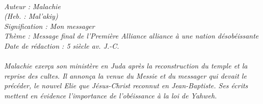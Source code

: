 \BFont
\noindent\hrulefill
{\footnotesize
\textit{
\bigskip
{\centering{}
\\Auteur : Malachie
\\(Heb. : Mal'akiy)
\\Signification : Mon messager
\\Thème : Message final de l'Première Alliance alliance à une nation désobéissante
\\Date de rédaction : 5 siècle av. J.-C.\\}
}
\textit{
\\Malachie exerça son ministère en Juda après la reconstruction du temple et la reprise des cultes. Il annonça la venue du Messie et du messager qui devait le précéder, le nouvel Elie que Jésus-Christ reconnut en Jean-Baptiste. Ses écrits mettent en évidence l'importance de l'obéissance à la loi de Yahweh.\bigskip
}
}
\par\nobreak\noindent\hrulefill

